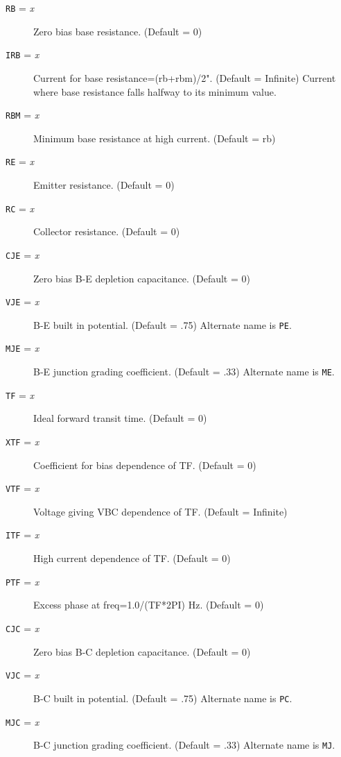 \begin{description}
\item[{\tt RB} = {\it x}]
Zero bias base resistance.  (Default = 0)

\item[{\tt IRB} = {\it x}]
Current for base resistance=(rb+rbm)/2".  (Default = Infinite) Current
where base resistance falls halfway to its minimum value.

\item[{\tt RBM} = {\it x}]
Minimum base resistance at high current.  (Default = rb)

\item[{\tt RE} = {\it x}]
Emitter resistance.  (Default = 0)

\item[{\tt RC} = {\it x}]
Collector resistance.  (Default = 0)

\item[{\tt CJE} = {\it x}]
Zero bias B-E depletion capacitance.  (Default = 0)

\item[{\tt VJE} = {\it x}]
B-E built in potential.  (Default = .75)  Alternate name is {\tt PE}.

\item[{\tt MJE} = {\it x}]
B-E junction grading coefficient.  (Default = .33)  Alternate name is {\tt ME}.

\item[{\tt TF} = {\it x}]
Ideal forward transit time.  (Default = 0)

\item[{\tt XTF} = {\it x}]
Coefficient for bias dependence of TF.  (Default = 0)

\item[{\tt VTF} = {\it x}]
Voltage giving VBC dependence of TF.  (Default = Infinite)

\item[{\tt ITF} = {\it x}]
High current dependence of TF.  (Default = 0)

\item[{\tt PTF} = {\it x}]
Excess phase at freq=1.0/(TF*2PI) Hz.  (Default = 0)

\item[{\tt CJC} = {\it x}]
Zero bias B-C depletion capacitance.  (Default = 0)

\item[{\tt VJC} = {\it x}]
B-C built in potential.  (Default = .75)  Alternate name is {\tt PC}.

\item[{\tt MJC} = {\it x}]
B-C junction grading coefficient.  (Default = .33)  Alternate name is {\tt MJ}.


\end{description}
